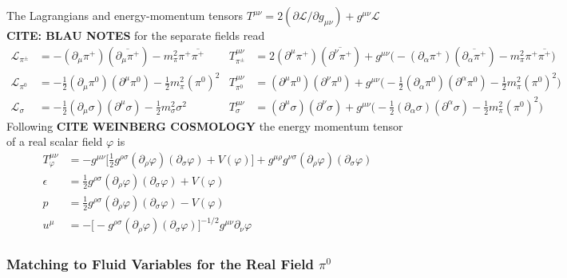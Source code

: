The Lagrangians and energy-momentum tensors $T^{\mu\nu}=2(\partial\mathscr{L}/\partial g_{\mu\nu})+g^{\mu\nu}\mathscr{L}$ \textbf{CITE: BLAU NOTES} for the separate fields read
\begin{subequations}
    \begin{align}
        \mathscr{L}_{\pi^\pm}&=-(\partial_\mu\pi^+)(\overline{\partial_\mu\pi^+})-m_\pi^2\pi^+\overline{\pi^+}&T^{\mu\nu}_{\pi^\pm}&=2(\partial^\mu\pi^+)(\overline{\partial^\nu\pi^+})+g^{\mu\nu}\big(-(\partial_\alpha\pi^+)(\overline{\partial_\alpha\pi^+})-m_\pi^2\pi^+\overline{\pi^+}\big)\\
        \mathscr{L}_{\pi^0}&=-\frac{1}{2}(\partial_\mu\pi^0)(\partial^\mu\pi^0)-\frac{1}{2}m_\pi^2(\pi^0)^2&T^{\mu\nu}_{\pi^0}&=(\partial^\mu\pi^0)(\partial^\nu\pi^0)+g^{\mu\nu}\big(-\frac{1}{2}(\partial_\alpha\pi^0)(\partial^\alpha\pi^0)-\frac{1}{2}m_\pi^2(\pi^0)^2\big)\\
        \mathscr{L}_\sigma&=-\frac{1}{2}(\partial_\mu\sigma)(\partial^\mu\sigma)-\frac{1}{2}m_\sigma^2\sigma^2&T^{\mu\nu}_{\sigma}&=(\partial^\mu\sigma)(\partial^\nu\sigma)+g^{\mu\nu}\big(-\frac{1}{2}(\partial_\alpha\sigma)(\partial^\alpha\sigma)-\frac{1}{2}m_\pi^2(\pi^0)^2\big)
    \end{align}
\end{subequations}
Following \textbf{CITE WEINBERG COSMOLOGY} the energy momentum tensor of a real scalar field $\varphi$ is
\begin{subequations}
    \begin{align}
        T_\varphi^{\mu\nu}&=-g^{\mu\nu}\big[\frac{1}{2}g^{\rho\sigma}(\partial_\rho\varphi)(\partial_\sigma\varphi)+V(\varphi)\big]+g^{\mu\rho}g^{\nu\sigma}(\partial_\rho\varphi)(\partial_\sigma\varphi)\\
        \epsilon&=\frac{1}{2}g^{\rho\sigma}(\partial_\rho\varphi)(\partial_\sigma\varphi)+V(\varphi)\\
        p&=\frac{1}{2}g^{\rho\sigma}(\partial_\rho\varphi)(\partial_\sigma\varphi)-V(\varphi)\\
        u^\mu&=-\big[-g^{\rho\sigma}(\partial_\rho\varphi)(\partial_\sigma\varphi)\big]^{-1/2}g^{\mu\nu}\partial_\nu\varphi
    \end{align}
\end{subequations}
\subsubsection{Matching to Fluid Variables for the Real Field $\pi^0$}
\label{sec:FluidFromRealScalar}

